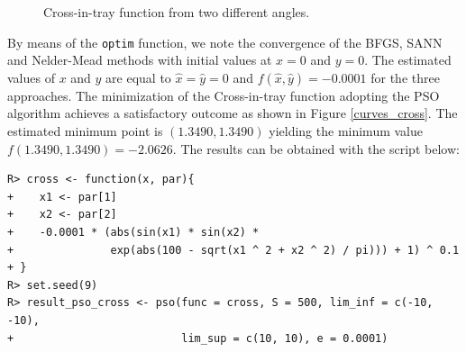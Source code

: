 \documentclass[10pt,letterpaper]{article}
\begin{document}
\begin{figure}[H]
\centering
{}
\caption{Cross-in-tray function from two different angles.}
\label{fig:cross}
\end{figure}


By means of the \texttt{optim} function, we note the convergence of the BFGS, SANN and Nelder-Mead methods with initial values at $x=0$ and $y=0$.
The estimated values of $x$ and $y$ are equal to $\widehat{x}=\widehat{y}=0$ and $f(\widehat{x},\widehat{y})=-0.0001$ for the three approaches.
The minimization of the Cross-in-tray function adopting the PSO algorithm achieves a satisfactory outcome as shown in Figure \ref{curves_cross}.
The estimated minimum point is $(1.3490,1.3490)$ yielding the minimum value $f(1.3490,1.3490) = -2.0626$.
The results can be obtained with the script below:
\begin{verbatim}
R> cross <- function(x, par){
+    x1 <- par[1]
+    x2 <- par[2]
+    -0.0001 * (abs(sin(x1) * sin(x2) *
+               exp(abs(100 - sqrt(x1 ^ 2 + x2 ^ 2) / pi))) + 1) ^ 0.1
+ }
R> set.seed(9)
R> result_pso_cross <- pso(func = cross, S = 500, lim_inf = c(-10, -10),
+                          lim_sup = c(10, 10), e = 0.0001)
\end{verbatim}
\end{document}
